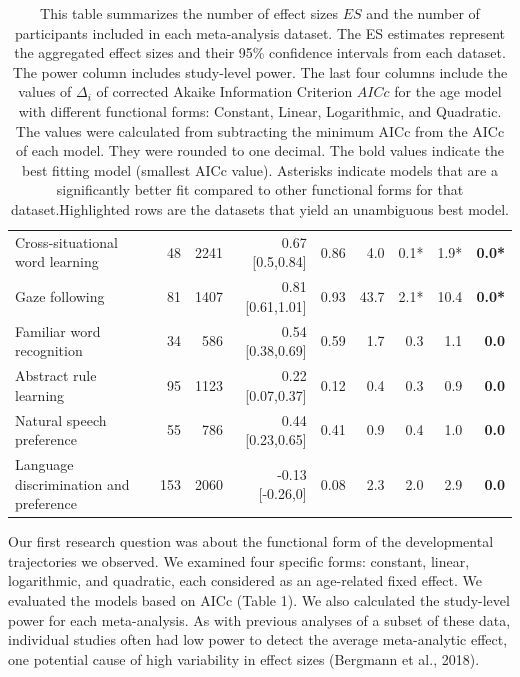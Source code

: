 \documentclass[10pt, letterpaper]{article}
\begin{document}
\begin{table}[ht]
\begin{tabular}{l|r|r|r|r|r|r|r|r}
Cross-situational word learning & 48 & 2241 & 0.67 [0.5,0.84] & 0.86 & 4.0 & 0.1* & 1.9* & \textbf{0.0*}\\
Gaze following  & 81 & 1407 & 0.81 [0.61,1.01] & 0.93 & 43.7 & 2.1* & 10.4 & \textbf{0.0*}\\
Familiar word recognition & 34 & 586 & 0.54 [0.38,0.69] & 0.59 & 1.7 & 0.3 & 1.1 & \textbf{0.0}\\
Abstract rule learning & 95 & 1123 & 0.22 [0.07,0.37] & 0.12 & 0.4 & 0.3 & 0.9 & \textbf{0.0}\\
Natural speech preference & 55 & 786 & 0.44 [0.23,0.65] & 0.41 & 0.9 & 0.4 & 1.0 & \textbf{0.0}\\
Language discrimination and preference & 153 & 2060 & -0.13 [-0.26,0] & 0.08 & 2.3 & 2.0 & 2.9 & \textbf{0.0}\\


\hline
\end{tabular}
\caption{\label{demo-table}This table summarizes the number of effect sizes \(ES\) and the number of participants included in each meta-analysis dataset. The ES estimates represent the aggregated effect sizes and their 95\% confidence intervals from each dataset. The power column includes study-level power. The last four columns include the values of $\Delta_{i}$ of corrected Akaike Information Criterion \(AICc\) for the age model with different functional forms: Constant, Linear, Logarithmic, and Quadratic. The values were calculated from subtracting the minimum AICc from the AICc of each model. They were rounded to one decimal. The bold values indicate the best fitting model (smallest AICc value). Asterisks indicate models that are a significantly better fit compared to other functional forms for that dataset.Highlighted rows are the datasets that yield an unambiguous best model.}
\end{table}

Our first research question was about the functional form of the
developmental trajectories we observed. We examined four specific forms:
constant, linear, logarithmic, and quadratic, each considered as an
age-related fixed effect. We evaluated the models based on AICc (Table
1). We also calculated the study-level power for each meta-analysis. As
with previous analyses of a subset of these data, individual studies
often had low power to detect the average meta-analytic effect, one
potential cause of high variability in effect sizes (Bergmann et al.,
2018).
\end{document}
